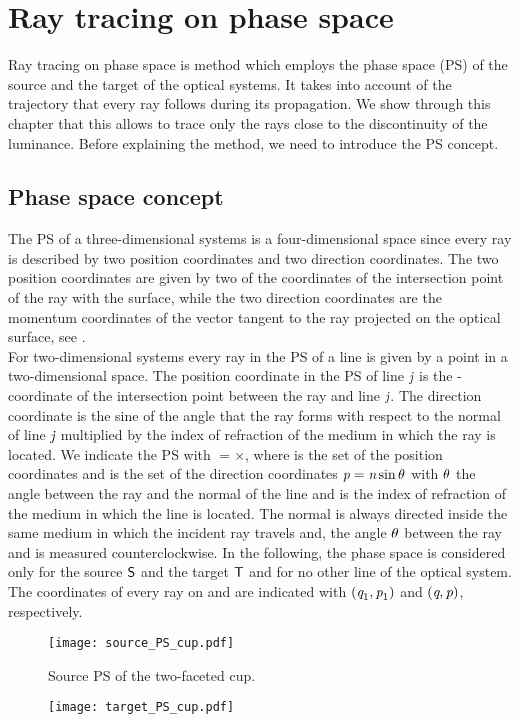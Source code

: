 \chapter{Ray tracing on phase space} \label{chap:PS}
Ray tracing on phase space is method which employs the phase space (PS) of the source and the target of the optical systems. 
It takes into account of the trajectory that every ray follows during its propagation.
We show through this chapter that this allows to trace only the rays close to the discontinuity of the luminance.
Before explaining the method, we need to introduce the PS concept.
\section{Phase space concept}
The PS of a three-dimensional systems is a four-dimensional space since every ray is described by two position coordinates
and two direction coordinates.
The two position coordinates are given by two of the coordinates of the intersection point of the ray with the surface, while the two direction coordinates are
the momentum coordinates of the vector tangent to the ray projected on the optical surface, see \cite{wolf2004geometric}.
\\ \indent For two-dimensional systems every ray in the PS of a line is given by a point in a two-dimensional space.
The position coordinate in the PS of line $\textit{j}$ is the -coordinate of the intersection point between the ray and line $\textit{j}$.
The direction coordinate is the sine of the angle that the ray forms with respect to the normal of line $\textit{j}$ multiplied by the index of refraction of the medium in which the ray is located.
We indicate the PS with $=$$\times$,
where  is the set of the position coordinates  and  is the set of the direction coordinates $\textit{p}=\textit{n}\sin{\theta}$ with $\theta$ the angle between the ray and the normal \vect{$\boldsymbol{\nu}$} of the line and  is the index of refraction of the medium in which the line is located.  
The normal \vect{$\boldsymbol{\nu}$} is always directed inside the same medium in which the incident ray travels and, 
the angle $\theta$ between the ray and \vect{$\boldsymbol{\nu}$} is measured counterclockwise.
In the following, the phase space is considered only for the source $\textsf{S}$ and the target $\textsf{T}$ and for no other line of the optical system.
The coordinates of every ray on  and  are indicated with $(\textit{q}_1,\textit{p}_1)$ and $(\textit{q},\textit{p})$, respectively. 
\begin{figure}[h]
  \begin{minipage}[h]{0.5\textwidth}
    \texttt{[image: source\_PS\_cup.pdf]}
    \caption{Source PS of the two-faceted cup.}
    \label{fig:coefficients}
  \end{minipage} 
  \begin{minipage}[h]{0.5\textwidth}
    \texttt{[image: target\_PS\_cup.pdf]}
    \caption{}
   \label{fig:coefficients2}
 \end{minipage}
\end{figure}


